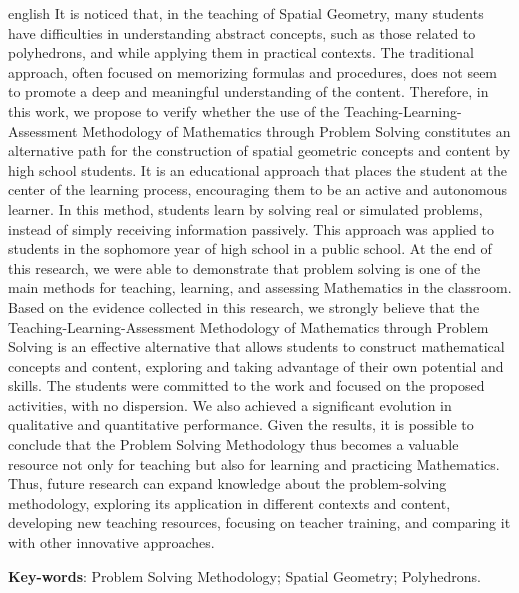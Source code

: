 \begin{resumo}[Abstract]
\begin{otherlanguage*}{english}
		It is noticed that, in the teaching of Spatial Geometry, many students have difficulties in understanding abstract concepts, such as those related to polyhedrons, and while applying them in practical contexts. The traditional approach, often focused on memorizing formulas and procedures, does not seem to promote a deep and meaningful understanding of the content. Therefore, in this work, we propose to verify whether the use of the Teaching-Learning-Assessment Methodology of Mathematics through Problem Solving constitutes an alternative path for the construction of spatial geometric concepts and content by high school students. It is an educational approach that places the student at the center of the learning process, encouraging them to be an active and autonomous learner. In this method, students learn by solving real or simulated problems, instead of simply receiving information passively. This approach was applied to students in the sophomore year of high school in a public school. At the end of this research, we were able to demonstrate that problem solving is one of the main methods for teaching, learning, and assessing Mathematics in the classroom. Based on the evidence collected in this research, we strongly believe that the Teaching-Learning-Assessment Methodology of Mathematics through Problem Solving is an effective alternative that allows students to construct mathematical concepts and content, exploring and taking advantage of their own potential and skills. The students were committed to the work and focused on the proposed activities, with no dispersion. We also achieved a significant evolution in qualitative and quantitative performance. Given the results, it is possible to conclude that the Problem Solving Methodology thus becomes a valuable resource not only for teaching but also for learning and practicing Mathematics. Thus, future research can expand knowledge about the problem-solving methodology, exploring its application in different contexts and content, developing new teaching resources, focusing on teacher training, and comparing it with other innovative approaches.

		\vspace{\onelineskip}

		\noindent
		\textbf{Key-words}: Problem Solving Methodology; Spatial Geometry; Polyhedrons.
	\end{otherlanguage*}
\end{resumo}
